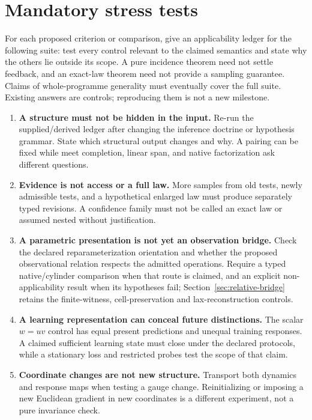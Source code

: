 \documentclass[11pt]{article}
\theoremstyle{remark}
\begin{document}
\section{Mandatory stress tests}
\label{sec:stress}

For each proposed criterion or comparison, give an applicability ledger for the following suite: test every control relevant to the claimed semantics and state why the others lie outside its scope. A pure incidence theorem need not settle feedback, and an exact-law theorem need not provide a sampling guarantee. Claims of whole-programme generality must eventually cover the full suite. Existing answers are controls; reproducing them is not a new milestone.

\begin{enumerate}
\item \textbf{A structure must not be hidden in the input.} Re-run the supplied/derived ledger after changing the inference doctrine or hypothesis grammar. State which structural output changes and why. A pairing can be fixed while meet completion, linear span, and native factorization ask different questions.
\item \textbf{Evidence is not access or a full law.} More samples from old tests, newly admissible tests, and a hypothetical enlarged law must produce separately typed revisions. A confidence family must not be called an exact law or assumed nested without justification.
\item \textbf{A parametric presentation is not yet an observation bridge.} Check the declared reparameterization orientation and whether the proposed observational relation respects the admitted operations. Require a typed native/cylinder comparison when that route is claimed, and an explicit non-applicability result when its hypotheses fail; Section~\ref{sec:relative-bridge} retains the finite-witness, cell-preservation and lax-reconstruction controls.
\item \textbf{A learning representation can conceal future distinctions.} The scalar $w=uv$ control has equal present predictions and unequal training responses. A claimed sufficient learning state must close under the declared protocols, while a stationary loss and restricted probes test the scope of that claim.
\item \textbf{Coordinate changes are not new structure.} Transport both dynamics and response maps when testing a gauge change. Reinitializing or imposing a new Euclidean gradient in new coordinates is a different experiment, not a pure invariance check.

\end{enumerate}
\end{document}
